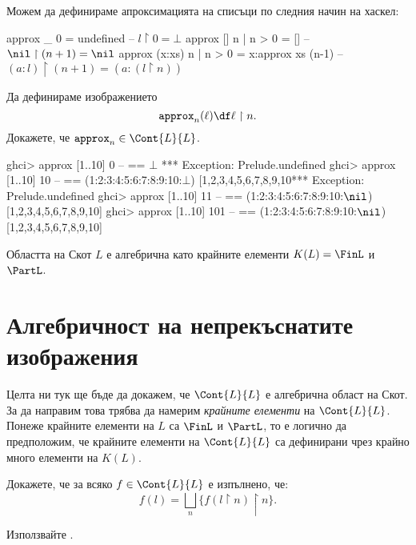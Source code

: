 Можем да дефинираме апроксимацията на списъци по следния начин на хаскел:
\begin{haskellcode}
approx _      0         = undefined         -- $l \upharpoonright 0 = \bot$
approx []     n | n > 0 = []                -- $\nil \upharpoonright (n+1) = \nil$
approx (x:xs) n | n > 0 = x:approx xs (n-1) -- $(a:l) \upharpoonright (n+1) = (a: (l\upharpoonright n))$
\end{haskellcode}

\begin{problem}
  \label{prob:approx}
  Да дефинираме изображението 
  \[\texttt{approx}_n(\ell) \df \ell \upharpoonright n.\]
  Докажете, че $\texttt{approx}_n \in \Cont{L}{L}$.
\end{problem}

\begin{haskellcode}
ghci> approx [1..10] 0    --  == $\bot$
*** Exception: Prelude.undefined
ghci> approx [1..10] 10   --  == (1:2:3:4:5:6:7:8:9:10:$\bot$)
[1,2,3,4,5,6,7,8,9,10*** Exception: Prelude.undefined  
ghci> approx [1..10] 11   --  == (1:2:3:4:5:6:7:8:9:10:$\nil$)
[1,2,3,4,5,6,7,8,9,10]
ghci> approx [1..10] 101  --  == (1:2:3:4:5:6:7:8:9:10:$\nil$)
[1,2,3,4,5,6,7,8,9,10]
\end{haskellcode}


\begin{proposition}
  Областта на Скот $L$ е алгебрична като крайните елементи $K(L) = \FinL$ и $\PartL$.
\end{proposition}

\section{Алгебричност на непрекъснатите изображения}

Целта ни тук ще бъде да докажем, че $\Cont{L}{L}$ е алгебрична област на Скот.
За да направим това трябва да намерим {\em крайните елементи} на $\Cont{L}{L}$.
Понеже крайните елементи на $L$ са $\FinL$ и $\PartL$, то е логично да предположим,
че крайните елементи на $\Cont{L}{L}$ са дефинирани чрез крайно много елементи на $K(L)$.

\begin{problem}
  Докажете, че за всяко $f \in \Cont{L}{L}$ е изпълнено, че:
  \[f(l) = \bigsqcup_n \{f(l \upharpoonright n)\upharpoonright n\}.\]
\end{problem}
\begin{hint}
  Използвайте .
\end{hint}

